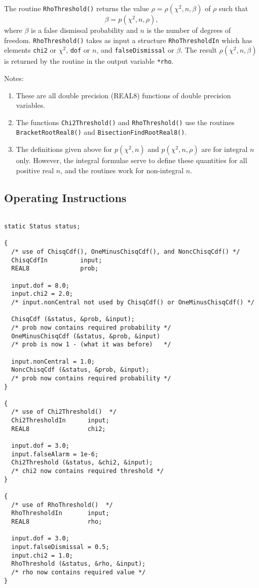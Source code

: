 \documentclass{article}
\begin{document}
The routine \verb+RhoThreshold()+ returns the value $\rho =
\rho(\chi^2,n,\beta)$ of $\rho$ such that 
$$
\beta = p(\chi^2,n,\rho),
$$
where $\beta$ is a false dismissal probability and $n$ is the number
of degrees of freedom.  \verb+RhoThreshold()+ takes as input a
structure \verb+RhoThresholdIn+ which has elements \verb+chi2+ or
$\chi^2$, \verb+dof+ or $n$, and \verb+falseDismissal+ or $\beta$.
The result $\rho(\chi^2,n,\beta)$ is returned by the routine in the
output variable \verb+*rho+. 


Notes:
\begin{enumerate}
\item These are all double precision (REAL8) functions of double
precision variables.
\item The functions \verb+Chi2Threshold()+ and \verb+RhoThreshold()+
use the routines \verb+BracketRootReal8()+ and
\verb+BisectionFindRootReal8()+. 
\item The definitions given above for $p(\chi^2,n)$ and
$p(\chi^2,n,\rho)$ are for integral $n$ only.  However,
the integral formulae serve to define these quantities for all
positive real $n$, and the routines work for non-integral $n$.
\end{enumerate}

\subsection{Operating Instructions}


\begin{verbatim}

static Status status;

{ 
  /* use of ChisqCdf(), OneMinusChisqCdf(), and NoncChisqCdf() */
  ChisqCdfIn         input;
  REAL8              prob;

  input.dof = 8.0;
  input.chi2 = 2.0;
  /* input.nonCentral not used by ChisqCdf() or OneMinusChisqCdf() */

  ChisqCdf (&status, &prob, &input);
  /* prob now contains required probability */
  OneMinusChisqCdf (&status, &prob, &input)
  /* prob is now 1 - (what it was before)   */

  input.nonCentral = 1.0;
  NoncChisqCdf (&status, &prob, &input);
  /* prob now contains required probability */
}

{
  /* use of Chi2Threshold()  */
  Chi2ThresholdIn      input;
  REAL8                chi2;

  input.dof = 3.0;
  input.falseAlarm = 1e-6;
  Chi2Threshold (&status, &chi2, &input);
  /* chi2 now contains required threshold */
}

{
  /* use of RhoThreshold()  */
  RhoThresholdIn       input;
  REAL8                rho;

  input.dof = 3.0;
  input.falseDismissal = 0.5;
  input.chi2 = 1.0;
  RhoThreshold (&status, &rho, &input);
  /* rho now contains required value */
}




\end{verbatim}
\end{document}
